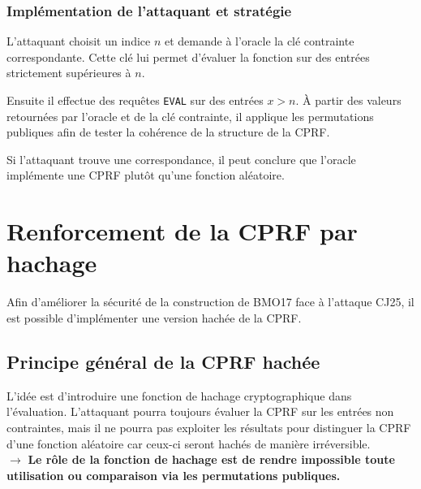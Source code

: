 \documentclass[9pt]{extarticle}
\begin{document}
\subsubsection{Implémentation de l’attaquant et stratégie}

L’attaquant choisit un indice $n$ et demande à l’oracle la clé
contrainte correspondante. Cette clé lui permet d’évaluer la fonction sur des entrées
strictement supérieures à $n$.

Ensuite il effectue des requêtes \texttt{EVAL} sur des entrées
$x > n$. À partir des valeurs retournées par l’oracle et de la clé contrainte, il
applique les permutations publiques afin de tester la cohérence de la structure de la CPRF.

Si l’attaquant trouve une correspondance, il peut conclure que l’oracle implémente une CPRF plutôt qu’une fonction aléatoire.

\section{Renforcement de la CPRF par hachage}

Afin d'améliorer la sécurité de la construction de BMO17 face à l'attaque CJ25,
il est possible d'implémenter une version hachée de la CPRF.

\subsection{Principe général de la CPRF hachée}

L’idée est d’introduire une fonction de hachage cryptographique dans l'évaluation. 
L'attaquant pourra toujours évaluer la CPRF sur les entrées non contraintes, 
mais il ne pourra pas exploiter les résultats pour distinguer la CPRF d’une fonction aléatoire
car ceux-ci seront hachés de manière irréversible.\\

$\rightarrow$ \textbf{Le rôle de la fonction de hachage est de rendre impossible toute utilisation ou comparaison
via les permutations publiques.}

\begin{center}
\end{center}
\end{document}
